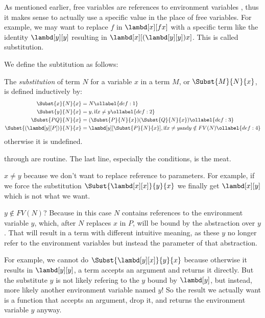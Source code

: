 \documentclass[../../../include/open-logic-section]{subfiles}
\begin{document}

As mentioned earlier, free variables are references to environment variables
, thus it makes sense to actually use a specific value in the place of free
variables. For example, we may want to replace $f$ in
$\lambd[x][f x]$ with a specific term like the identity
$\lambd[y][y]$ resulting in $\lambd[x][(\lambd[y][y]) x]$. This is
called substitution.

We define the subtitution as follows:

\begin{defn}[Substitution] 
  The \emph{substitution} of term $N$ for a variable $x$ in a term $M$, or
  $\Subst{M}{N}{x}$,  is defined inductively by:
  \begin{align}
    \Subst{x}{N}{x}       &= N \ollabel{def:1} \\
    \Subst{y}{N}{x}       &= y, \text{if} x \neq y \ollabel{def:2} \\
    \Subst{PQ}{N}{x} &= (\Subst{P}{N}{x}) (\Subst{Q}{N}{x}) \ollabel{def:3} \\
    \Subst{(\lambd[y][P])}{N}{x}  &= \lambd[y][\Subst{P}{N}{x}], \text{if} x \neq y
                                        \text{and} y \notin FV(N) \ollabel{def:4}
  \end{align}
  otherwise it is undefined.
\end{defn}

 through  are routine. The last line,
especially the conditions, is the meat. 

$x \neq y$ because we don't want to replace reference to parameters.
For example, if we force the substitution
$\Subst{\lambd[x][x]}{y}{x}$ we finally get $\lambd[x][y]$ which
is not what we want.

$y \notin FV(N)$? Because in this case $N$ contains references to the environment variable $y$, which,
after $N$ replaces $x$ in $P$, will be bound by the abstraction over
$y$. That will result in a term with different intuitive meaning, as
these $y$ no longer refer to the environment variables but instead
the parameter of that abstraction. 

For example, we cannot do $\Subst{\lambd[y][x]}{y}{x}$ because
otherwise it results in $\lambd[y][y]$, a term accepts an argument and
returns it directly. But the substitute $y$ is not likely refering
to the $y$ bound by $\lambd[y]$, but instead, more likely another
environment variable named $y$! So the result we actually want is a
function that accepts an argument, drop it, and returns the
environment variable $y$ anyway.
\end{document}

